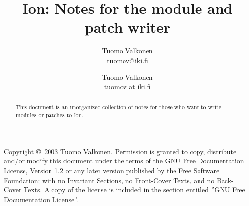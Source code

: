\documentclass[english,a4paper,11pt,oldtoc,mctitle]{artikel3}
\title{Ion: Notes for the module and patch writer}
\author{Tuomo Valkonen \\ tuomov@iki.fi}
\author{Tuomo Valkonen \\ tuomov at iki.fi}
\begin{document}
\maketitle

Copyright \copyright\  2003 Tuomo Valkonen.
Permission is granted to copy, distribute and/or modify this document
under the terms of the GNU Free Documentation License, Version 1.2
or any later version published by the Free Software Foundation;
with no Invariant Sections, no Front-Cover Texts, and no Back-Cover Texts.
A copy of the license is included in the section entitled ''GNU
Free Documentation License''.

\bigskip

\begin{abstract}
    This document is an unorganized collection of notes for
    those who want to write modules or patches to Ion.
\end{abstract}

\tableofcontents











\appendix



\printindex
\end{document}
